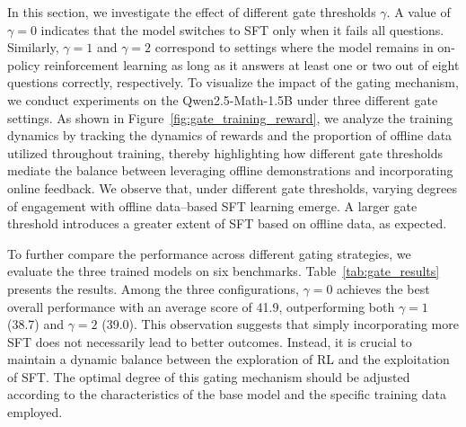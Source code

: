 In this section, we investigate the effect of different gate thresholds $\gamma$. A value of $\gamma=0$ indicates that the model switches to SFT only when it fails all questions.
Similarly, $\gamma=1$ and $\gamma=2$ correspond to settings where the model remains in on-policy reinforcement learning as long as it answers at least one or two out of eight questions correctly, respectively.
To visualize the impact of the gating mechanism, we conduct experiments on the Qwen2.5-Math-1.5B under three different gate settings.
As shown in Figure~\ref{fig:gate_training_reward}, we analyze the training dynamics by tracking the dynamics of rewards and the proportion of offline data utilized throughout training, thereby highlighting how different gate thresholds mediate the balance between leveraging offline demonstrations and incorporating online feedback.
We observe that, under different gate thresholds, varying degrees of engagement with offline data–based SFT learning emerge.
A larger gate threshold introduces a greater extent of SFT based on offline data, as expected.

\begin{table}[!ht]
\centering
\caption{Performance of \mot with different switch gate $\gamma$ on Qwen2.5-Math-1.5B.}
\label{tab:gate_results}
\end{table}

To further compare the performance across different gating strategies, we evaluate the three trained models on six benchmarks.
Table~\ref{tab:gate_results} presents the results.
Among the three configurations, $\gamma=0$ achieves the best overall performance with an average score of 41.9, outperforming both $\gamma=1$ (38.7) and $\gamma=2$ (39.0).
This observation suggests that simply incorporating more SFT does not necessarily lead to better outcomes.
Instead, it is crucial to maintain a dynamic balance between the \textcolor{cyan!40!black}{exploration} of RL and the \textcolor{cyan!40!red}{exploitation} of SFT.
The optimal degree of this gating mechanism should be adjusted according to the characteristics of the base model and the specific training data employed.
